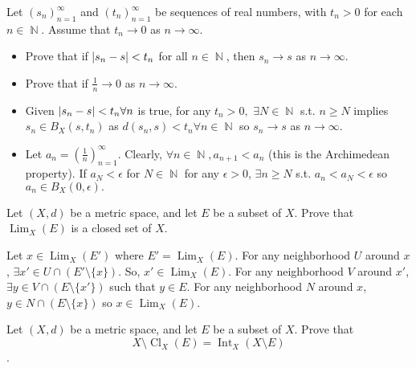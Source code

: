 \documentclass[12pt,letterpaper,boxed]{hmcpset}
\DeclareMathOperator{\Lim}{Lim}
\DeclareMathOperator{\Int}{Int}
\DeclareMathOperator{\Cl}{Cl}
\DeclareMathOperator{\N}{\mathbb{N}}
\DeclarePairedDelimiter\abs{\lvert}{\rvert}%
\begin{document}
\begin{problem}[Exercise 1.15]
Let $(s_n)_{n=1}^{\infty}$ and $(t_n)_{n=1}^{\infty}$ be sequences of real numbers, with $t_n > 0$ for each $n\in\N.$ Assume that $t_n \rightarrow 0$ as $n\rightarrow \infty.$
\vspace{-2mm}
\begin{itemize}
	\itemsep0em
	\item Prove that if $\abs{s_n - s} < t_n$ for all $n \in \N$, then $s_n \rightarrow s$ as $n \rightarrow \infty.$
	\item Prove that if $\frac{1}{n}\rightarrow 0$ as $n\rightarrow \infty.$
\end{itemize}
\end{problem}

\begin{solution}
\vspace{-2mm}
\begin{itemize}
	\itemsep0em
	\item Given $\abs{s_n - s} < t_n \forall n$ is true, for any $t_n > 0,$ $\exists N \in \N$ s.t. $n \ge N$ implies $s_n \in B_X(s, t_n)$ as $d(s_n , s) < t_n \forall n\in\N$ so $s_n\rightarrow s$ as $n \rightarrow \infty.$
	\item Let $a_n = (\frac{1}{n})_{n=1}^{\infty}$. Clearly, $\forall n\in \N, a_{n+1} < a_{n}$ (this is the Archimedean property). If $a_N < \epsilon$ for $N \in \N$ for any $\epsilon > 0$, $\exists n \ge N$ s.t. $a_n < a_N < \epsilon$ so $a_n \in B_X(0, \epsilon).$ 
\end{itemize}
\end{solution}

\begin{problem}[Exercise 1.21]
Let $(X,d)$ be a metric space, and let $E$ be a subset of $X$. Prove that $\Lim_X(E)$ is a closed set of $X$.
\end{problem}

\begin{solution}
Let $x \in \Lim_X(E')$ where $E' = \Lim_X(E).$ For any neighborhood $U$ around $x$, $\exists x' \in U \cap (E'\setminus \{x\})$. So, $x' \in \Lim_X(E).$  For any neighborhood $V$ around $x'$, $\exists y \in V \cap (E\setminus \{x'\})$ such that $y\in E.$ For any neighborhood $N$ around $x$, $y\in N\cap(E\setminus\{ x\})$ so $x \in \Lim_X(E)$.
\end{solution}

\begin{problem}[Exercise 1.24]
Let $(X,d)$ be a metric space, and let $E$ be a subset of $X$. Prove that $$X\setminus\Cl_X(E)=\Int_X(X\setminus E)$$. 
\end{problem}

\begin{solution}

\end{solution}
\end{document}
